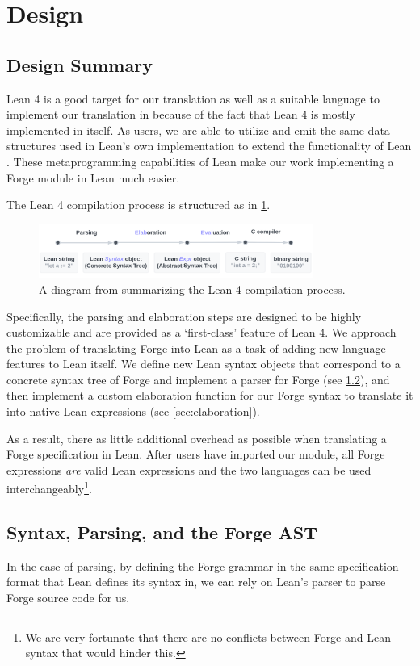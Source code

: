 \section{Design}
\subsection{Design Summary}\label{sec:design-summary}
Lean 4 is a good target for our translation as well as a suitable language to implement our translation in because of the fact that Lean 4 is mostly implemented in itself. As users, we are able to utilize and emit the same data structures used in Lean's own implementation to extend the functionality of Lean \cite{moura2021lean}. These metaprogramming capabilities of Lean make our work implementing a Forge module in Lean much easier. 

The Lean 4 compilation process is structured as in \cref{fig:lean-compilation}. 
\begin{figure}[h!]
\centering
\includegraphics[width=0.8\textwidth]{images/lean-compiler.png}
\caption{A diagram from \cite{metaprogramming} summarizing the Lean 4 compilation process.}
\label{fig:lean-compilation}
\end{figure}

Specifically, the parsing and elaboration steps are designed to be highly customizable and are provided as a `first-class' feature of Lean 4. We approach the problem of translating Forge into Lean as a task of adding new language features to Lean itself. We define new Lean syntax objects that correspond to a concrete syntax tree of Forge and implement a parser for Forge (see \cref{sec:parsing}), and then implement a custom elaboration function for our Forge syntax to translate it into native Lean expressions (see \cref{sec:elaboration}). 

As a result, there as little additional overhead as possible when translating a Forge specification in Lean. After users have imported our module, all Forge expressions \emph{are} valid Lean expressions and the two languages can be used interchangeably\footnote{We are very fortunate that there are no conflicts between Forge and Lean syntax that would hinder this.}.

\subsection{Syntax, Parsing, and the Forge AST}\label{sec:parsing}
In the case of parsing, by defining the Forge grammar in the same specification format that Lean defines its syntax in, we can rely on Lean's parser to parse Forge source code for us.

